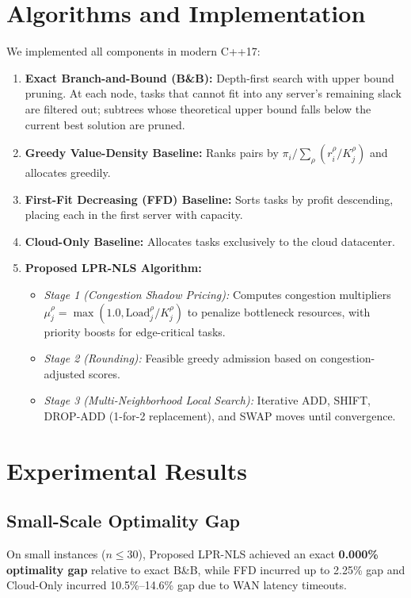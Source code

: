 \documentclass[conference,10pt]{IEEEtran}
\begin{document}
\section{Algorithms and Implementation}
We implemented all components in modern C++17:
\begin{enumerate}
    \item \textbf{Exact Branch-and-Bound (B\&B):} Depth-first search with upper bound pruning. At each node, tasks that cannot fit into any server's remaining slack are filtered out; subtrees whose theoretical upper bound falls below the current best solution are pruned.
    \item \textbf{Greedy Value-Density Baseline:} Ranks pairs by $\pi_i / \sum_\rho (r_i^\rho / K_j^\rho)$ and allocates greedily.
    \item \textbf{First-Fit Decreasing (FFD) Baseline:} Sorts tasks by profit descending, placing each in the first server with capacity.
    \item \textbf{Cloud-Only Baseline:} Allocates tasks exclusively to the cloud datacenter.
    \item \textbf{Proposed LPR-NLS Algorithm:}
    \begin{itemize}
        \item \textit{Stage 1 (Congestion Shadow Pricing):} Computes congestion multipliers $\mu_j^\rho = \max(1.0, \text{Load}_j^\rho / K_j^\rho)$ to penalize bottleneck resources, with priority boosts for edge-critical tasks.
        \item \textit{Stage 2 (Rounding):} Feasible greedy admission based on congestion-adjusted scores.
        \item \textit{Stage 3 (Multi-Neighborhood Local Search):} Iterative ADD, SHIFT, DROP-ADD (1-for-2 replacement), and SWAP moves until convergence.
    \end{itemize}
\end{enumerate}

\section{Experimental Results}
\subsection{Small-Scale Optimality Gap}
On small instances ($n \le 30$), Proposed LPR-NLS achieved an exact \textbf{0.000\% optimality gap} relative to exact B\&B, while FFD incurred up to 2.25\% gap and Cloud-Only incurred 10.5\%--14.6\% gap due to WAN latency timeouts.
\end{document}

